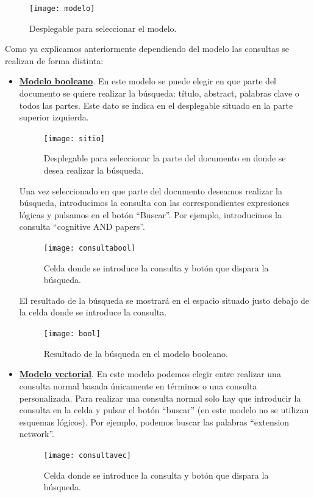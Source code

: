 \documentclass[size=a4, parskip=half, titlepage=false, toc=flat, toc=bib, 12pt, twoside]{scrartcl}
\theoremstyle{theorem-style}
\theoremstyle{definition-style}
\theoremstyle{remark-style}
\theoremstyle{example-style}
\theoremstyle{definition-style}
\theoremstyle{remark-style}
\begin{document}
\begin{figure}[H]
\centering
\texttt{[image: modelo]}
\caption{Desplegable para seleccionar el modelo.}
\end{figure}

Como ya explicamos anteriormente dependiendo del modelo las consultas se realizan de forma distinta:
\begin{itemize}
\item \textbf{\underline{Modelo booleano}}. En este modelo se puede elegir en que parte del documento se quiere realizar la búsqueda: título, abstract, palabras clave o todos las partes. Este dato se indica en el desplegable situado en la parte superior izquierda.

\begin{figure}[H]
\centering
\texttt{[image: sitio]}
\caption{Desplegable para seleccionar la parte del documento en donde se desea realizar la búsqueda.}
\end{figure}

Una vez seleccionado en que parte del documento deseamos realizar la búsqueda, introducimos la consulta con las correspondientes expresiones lógicas y pulsamos en el botón ``Buscar''. Por ejemplo, introducimos la consulta ``cognitive AND papers''.

\begin{figure}[H]
\centering
\texttt{[image: consultabool]}
\caption{Celda donde se introduce la consulta y botón que dispara la búsqueda.}
\end{figure}
El resultado de la búsqueda se mostrará en el espacio situado justo debajo de la celda donde se introduce la consulta.

\begin{figure}[H]
\centering
\texttt{[image: bool]}
\caption{Resultado de la búsqueda en el modelo booleano.}
\end{figure}

\item \textbf{\underline{Modelo vectorial}}. En este modelo podemos elegir entre realizar una consulta normal basada únicamente en términos o una consulta personalizada. Para realizar una consulta normal solo hay que introducir la consulta en la celda y pulsar el botón ``buscar'' (en este modelo no se utilizan esquemas lógicos). Por ejemplo, podemos buscar las palabras ``extension network''.

\begin{figure}[H]
\centering
\texttt{[image: consultavec]}
\caption{Celda donde se introduce la consulta y botón que dispara la búsqueda.}
\end{figure}
\end{itemize}
\end{document}
